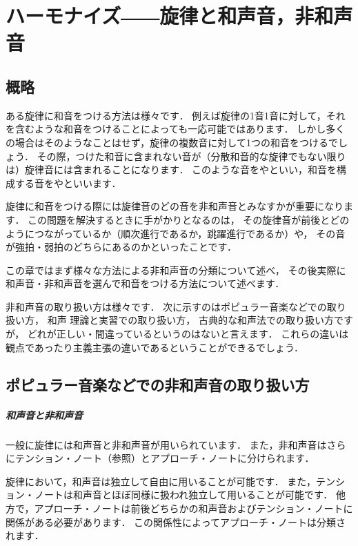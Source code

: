 \documentclass[dvipdfmx,uplatex,b5paper,openany,jbase=12Q,nomag*,textwidth-limit=44%
               ]{gachimuchi}[2020/05/05]
\begin{document}
\chapter{ハーモナイズ――旋律と和声音，非和声音}
\section{概略}
ある旋律に和音をつける方法は様々です．
例えば旋律の1音1音に対して，それを含むような和音をつけることによっても一応可能ではあります．
しかし多くの場合はそのようなことはせず，旋律の複数音に対して1つの和音をつけるでしょう．
その際，つけた和音に含まれない音が（分散和音的な旋律でもない限りは）旋律音には含まれることになります．
このような音をやといい，和音を構成する音をやといいます．

旋律に和音をつける際には旋律音のどの音を非和声音とみなすかが重要になります．
この問題を解決するときに手がかりとなるのは，
その旋律音が前後とどのようにつながっているか（順次進行であるか，跳躍進行であるか）や，
その音が強拍・弱拍のどちらにあるのかといったことです．

この章ではまず様々な方法による非和声音の分類について述べ，
その後実際に和声音・非和声音を選んで和音をつける方法について述べます．

\begin{Yodan}
非和声音の取り扱い方は様々です．
次に示すのはポピュラー音楽などでの取り扱い方\cite{rgYAHAGI1}，
和声 理論と実習\cite{chSHIMAOKA1i,chSHIMAOKA1ii,chSHIMAOKA1iii}での取り扱い方，
古典的な和声法\cite{chSHIMOFUSA1,chSHIMOFUSA2,mgKIKUCHI1}での取り扱い方ですが，
どれが正しい・間違っているというのはないと言えます．
これらの違いは観点であったり主義主張の違いであるということができるでしょう．
\end{Yodan}
\section{ポピュラー音楽などでの非和声音の取り扱い方}
\paragraph{和声音と非和声音}
一般に旋律には和声音と非和声音が用いられています．
また，非和声音はさらにテンション・ノート（参照）とアプローチ・ノートに分けられます．

旋律において，和声音は独立して自由に用いることが可能です．
また，テンション・ノートは和声音とほぼ同様に扱われ独立して用いることが可能です．
他方で，アプローチ・ノートは前後どちらかの和声音およびテンション・ノートに関係がある必要があります．
この関係性によってアプローチ・ノートは分類されます．
\end{document}
